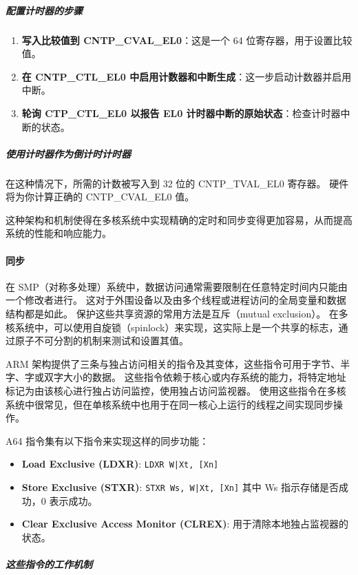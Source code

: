 \subparagraph*{配置计时器的步骤}

\begin{enumerate}
  \item
    \textbf{写入比较值到 CNTP\_CVAL\_EL0}：这是一个 64 位寄存器，用于设置比较值。
  \item
    \textbf{在 CNTP\_CTL\_EL0 中启用计数器和中断生成}：这一步启动计数器并启用中断。
  \item
    \textbf{轮询 CTP\_CTL\_EL0 以报告 EL0 计时器中断的原始状态}：检查计时器中断的状态。
\end{enumerate}

\subparagraph*{使用计时器作为倒计时计时器}

在这种情况下，所需的计数被写入到 32 位的 CNTP\_TVAL\_EL0 寄存器。
硬件将为你计算正确的 CNTP\_CVAL\_EL0 值。

这种架构和机制使得在多核系统中实现精确的定时和同步变得更加容易，从而提高系统的性能和响应能力。

\paragraph{同步}\label{sec:synchronization}

在 SMP（对称多处理）系统中，数据访问通常需要限制在任意特定时间内只能由一个修改者进行。
这对于外围设备以及由多个线程或进程访问的全局变量和数据结构都是如此。
保护这些共享资源的常用方法是互斥（mutual exclusion）。
在多核系统中，可以使用自旋锁（spinlock）来实现，这实际上是一个共享的标志，通过原子不可分割的机制来测试和设置其值。

ARM 架构提供了三条与独占访问相关的指令及其变体，这些指令可用于字节、半字、字或双字大小的数据。
这些指令依赖于核心或内存系统的能力，将特定地址标记为由该核心进行独占访问监控，使用独占访问监视器。
使用这些指令在多核系统中很常见，但在单核系统中也用于在同一核心上运行的线程之间实现同步操作。

A64 指令集有以下指令来实现这样的同步功能：

\begin{itemize}
\item
  \textbf{Load Exclusive (LDXR)}:
  {\lstinline!LDXR W|Xt, [Xn]!}
\item
  \textbf{Store Exclusive (STXR)}:
  {\lstinline!STXR Ws, W|Xt, [Xn]!}
  其中 Ws 指示存储是否成功，0 表示成功。
\item
  \textbf{Clear Exclusive Access Monitor (CLREX)}:
  用于清除本地独占监视器的状态。
\end{itemize}

\subparagraph*{这些指令的工作机制}

